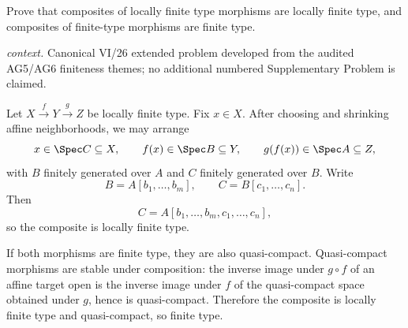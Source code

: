 \begin{problem}[Composition]\label{prob:vi26-p07}
Prove that composites of locally finite type morphisms are locally finite type, and composites of finite-type morphisms are finite type.
\par\smallskip\noindent\textit{context.} Canonical VI/26 extended problem developed from the audited AG5/AG6 finiteness themes; no additional numbered Supplementary Problem is claimed.
\end{problem}

\ifdefined\FullProblemDossiers
\begin{solution}
Let \(X\xrightarrow f Y\xrightarrow g Z\) be locally finite type.  Fix \(x\in X\).  After choosing
and shrinking affine neighborhoods, we may arrange
\[
x\in\Spec C\subseteq X,\qquad
f(x)\in\Spec B\subseteq Y,\qquad
g(f(x))\in\Spec A\subseteq Z,
\]
with \(B\) finitely generated over \(A\) and \(C\) finitely generated over \(B\).  Write
\[
B=A[b_1,\ldots,b_m],\qquad C=B[c_1,\ldots,c_n].
\]
Then
\[
C=A[b_1,\ldots,b_m,c_1,\ldots,c_n],
\]
so the composite is locally finite type.

If both morphisms are finite type, they are also quasi-compact.  Quasi-compact morphisms are stable
under composition: the inverse image under \(g\circ f\) of an affine target open is the inverse image
under \(f\) of the quasi-compact space obtained under \(g\), hence is quasi-compact.  Therefore the
composite is locally finite type and quasi-compact, so finite type.
\end{solution}
\fi
